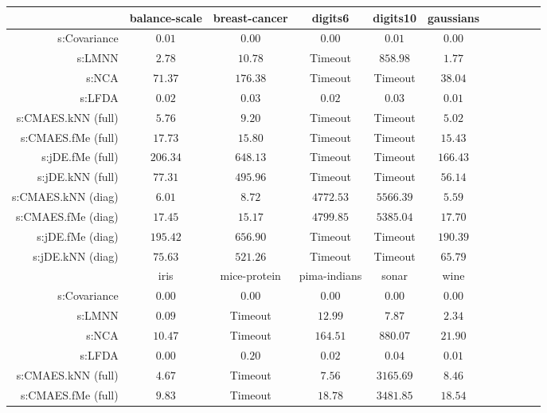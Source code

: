 \begin{table}[ht] \centering
{\small\renewcommand{\arraystretch}{1.0}
\setlength{\tabcolsep}{2pt}
\begin{tabular}{rcccccccccc}
\toprule


& \multicolumn{1}{c}{balance-scale} & \multicolumn{1}{c}{breast-cancer} & \multicolumn{1}{c}{digits6} & \multicolumn{1}{c}{digits10} & \multicolumn{1}{c}{gaussians} \\ 
\midrule
s:Covariance & $\bm{0.01}$ & $\bm{0.00}$ & $\bm{0.00}$ & $\bm{0.01}$ & $\bm{0.00}$ \\
s:LMNN & $2.78$ & $10.78$ & Timeout  & $858.98$ & $1.77$ \\
s:NCA & $71.37$ & $176.38$ & Timeout  & Timeout  & $38.04$ \\
s:LFDA & $0.02$ & $0.03$ & $0.02$ & $0.03$ & $0.01$ \\
s:CMAES.kNN (full) & $5.76$ & $9.20$ & Timeout  & Timeout  & $5.02$ \\
s:CMAES.fMe (full) & $17.73$ & $15.80$ & Timeout  & Timeout  & $15.43$ \\
s:jDE.fMe (full) & $206.34$ & $648.13$ & Timeout  & Timeout  & $166.43$ \\
s:jDE.kNN (full) & $77.31$ & $495.96$ & Timeout  & Timeout  & $56.14$ \\
s:CMAES.kNN (diag) & $6.01$ & $8.72$ & $4772.53$ & $5566.39$ & $5.59$ \\
s:CMAES.fMe (diag) & $17.45$ & $15.17$ & $4799.85$ & $5385.04$ & $17.70$ \\
s:jDE.fMe (diag) & $195.42$ & $656.90$ & Timeout  & Timeout  & $190.39$ \\
s:jDE.kNN (diag) & $75.63$ & $521.26$ & Timeout  & Timeout  & $65.79$ \\
\midrule
& \multicolumn{1}{c}{iris} & \multicolumn{1}{c}{mice-protein} & \multicolumn{1}{c}{pima-indians} & \multicolumn{1}{c}{sonar} & \multicolumn{1}{c}{wine} \\ 
\midrule
s:Covariance & $\bm{0.00}$ & $\bm{0.00}$ & $\bm{0.00}$ & $\bm{0.00}$ & $\bm{0.00}$ \\
s:LMNN & $0.09$ & Timeout  & $12.99$ & $7.87$ & $2.34$ \\
s:NCA & $10.47$ & Timeout  & $164.51$ & $880.07$ & $21.90$ \\
s:LFDA & $\bm{0.00}$ & $0.20$ & $0.02$ & $0.04$ & $0.01$ \\
s:CMAES.kNN (full) & $4.67$ & Timeout  & $7.56$ & $3165.69$ & $8.46$ \\
s:CMAES.fMe (full) & $9.83$ & Timeout  & $18.78$ & $3481.85$ & $18.54$ \\

\end{tabular}}
\end{table}
